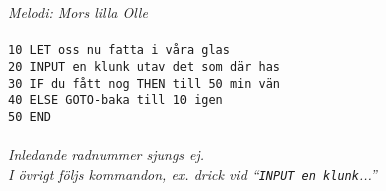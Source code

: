 {\footnotesize\textit{Melodi: Mors lilla Olle}}\\
\\
\texttt{10 LET oss nu fatta i våra glas}\\
\texttt{20 INPUT en klunk utav det som där has}\\
\texttt{30 IF du fått nog THEN till 50 min vän}\\
\texttt{40 ELSE GOTO-baka till 10 igen}\\
\texttt{50 END}\\
\\
{\footnotesize\textit{Inledande radnummer sjungs ej.\\ I övrigt följs
    kommandon, ex. drick vid ``\texttt{INPUT en klunk}...''}}
